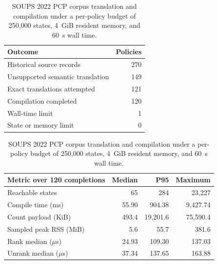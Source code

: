 \begin{table}[t]
\centering
\small
\caption{SOUPS 2022 PCP corpus translation and compilation under a per-policy
budget of 250,000 states, 4~GiB resident memory, and 60~s wall time.}
\label{tab:realpolicy}
\begin{tabular}{lr}
\toprule
Outcome & Policies \\
\midrule
Historical source records & 270 \\
Unsupported semantic translation & 149 \\
Exact translations attempted & 121 \\
Compilation completed & 120 \\
Wall-time limit & 1 \\
State or memory limit & 0 \\
\bottomrule
\end{tabular}
\vspace{3pt}

\begin{tabular}{lrrr}
\toprule
Metric over 120 completions & Median & P95 & Maximum \\
\midrule
Reachable states & 65 & 284 & 23,227 \\
Compile time (ms) & 55.90 & 904.38 & 9,427.74 \\
Count payload (KiB) & 493.4 & 19,201.6 & 75,590.4 \\
Sampled peak RSS (MiB) & 5.6 & 55.7 & 381.6 \\
Rank median ($\mu$s) & 24.93 & 109.30 & 137.03 \\
Unrank median ($\mu$s) & 37.34 & 137.65 & 163.88 \\
\bottomrule
\end{tabular}
\end{table}
